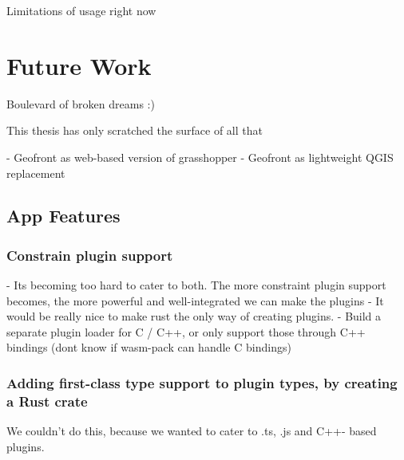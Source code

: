 Limitations of usage right now



\section{Future Work}
Boulevard of broken dreams :) 

This thesis has only scratched the surface of all that

- Geofront as web-based version of grasshopper
- Geofront as lightweight QGIS replacement 





\subsection{App Features}

\subsubsection{ Constrain plugin support}
- Its becoming too hard to cater to both. The more constraint plugin support becomes, the more powerful and well-integrated we can make the plugins
- It would be really nice to make rust the only way of creating plugins. 
- Build a separate plugin loader for C / C++, or only support those through C++ bindings (dont know if wasm-pack can handle C bindings)


\subsubsection{Adding first-class type support to plugin types, by creating a Rust crate }
We couldn't do this, because we wanted to cater to .ts, .js and C++- based plugins.